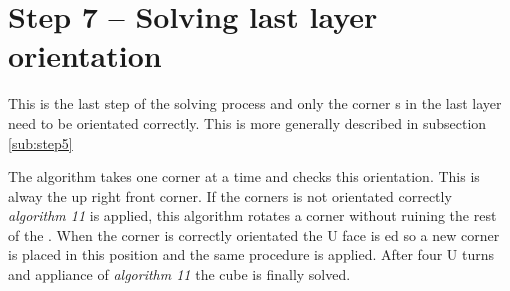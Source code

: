\section{Step 7 -- Solving last layer orientation}
This is the last step of the solving process and only the corner \cpiece{}s in the last layer need to be orientated correctly. This is more generally described in subsection \ref{sub:step5}

The algorithm takes one corner \cpiece{} at a time and checks this orientation. This is alway the up right front corner. If the corners is not orientated correctly \textit{algorithm 11} is applied, this algorithm rotates a corner without ruining the rest of the \cube{}. When the corner is correctly orientated the U face is \twist{}ed so a new corner is placed in this position and the same procedure is applied. After four U turns and appliance of \textit{algorithm 11} the cube is finally solved. 



\begin{comment}
In the last layer the corners in the last layer were poisitend correctly but not oreiented. In this step will the coreners be oreinted correctly and as result it will lead to that the \rubiks{} will be solved.

This step is very simple because it there is only four corners to control and either the corner is oriented correctly or is isn't.  

The program vil first control that the front-right-up corner is oriented correctly if not the will use the an algorithm twice and after the program vil control the corner again if the corner is not oriented correctly his time the use teh algorithme and will continue with this until the corner is oriented correctly. 
Then the corner is orented correctly the program will make at up move ("U") and will control the new corner and the program will do this with every corner in the last layer until they are oriented corectly.  

\end{comment}
